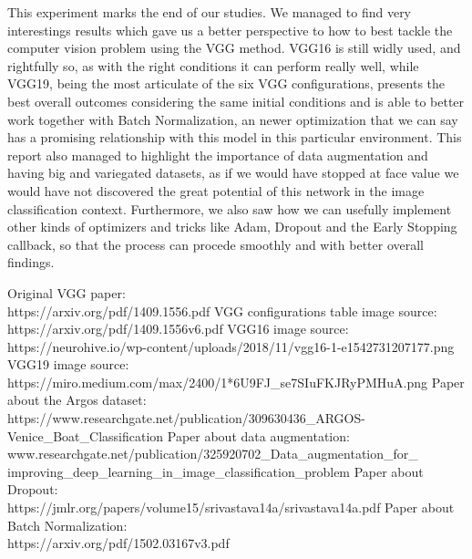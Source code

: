 \documentclass[12pt,a4paper]{report}
\begin{document}
This experiment marks the end of our studies. We managed to find very interestings results which gave us a better perspective to how to best tackle the computer vision problem using the VGG method. VGG16 is still widly used, and rightfully so, as with the right conditions it can perform really well, while VGG19, being the most articulate of the six VGG configurations, presents the best overall outcomes considering the same initial conditions and is able to better work together with Batch Normalization, an newer optimization that we can say has a promising relationship with this model in this particular environment. This report also managed to highlight the importance of data augmentation and having big and variegated datasets, as if we would have stopped at face value we would have not discovered the great potential of this network in the image classification context. Furthermore, we also saw how we can usefully implement other kinds of optimizers and tricks like Adam, Dropout and the Early Stopping callback, so that the process can procede smoothly and with better overall findings.



\begin{thebibliography}{1}
Original VGG paper:\\https://arxiv.org/pdf/1409.1556.pdf
VGG configurations table image source:\\https://arxiv.org/pdf/1409.1556v6.pdf
VGG16 image source:\\https://neurohive.io/wp-content/uploads/2018/11/vgg16-1-e1542731207177.png
VGG19 image source:\\https://miro.medium.com/max/2400/1*6U9FJ{\_}se7SIuFKJRyPMHuA.png
Paper about the Argos dataset:\\https://www.researchgate.net/publication/309630436{\_}ARGOS-Venice{\_}Boat{\_}Classification
Paper about data augmentation:\\www.researchgate.net/publication/325920702{\_}Data{\_}augmentation{\_}for{\_}\\improving{\_}deep{\_}learning{\_}in{\_}image{\_}classification{\_}problem
Paper about Dropout:\\https://jmlr.org/papers/volume15/srivastava14a/srivastava14a.pdf
Paper about Batch Normalization:\\https://arxiv.org/pdf/1502.03167v3.pdf
\end{thebibliography}
\end{document}

